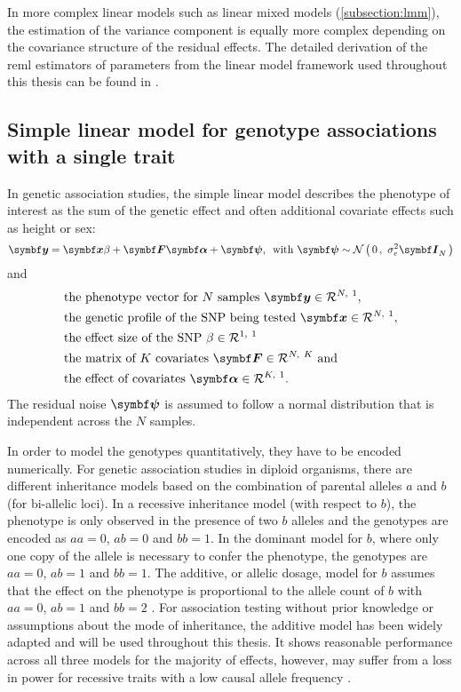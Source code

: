 In more complex linear models such as linear mixed models (\cref{subsection:lmm}), the estimation of the variance component is equally more complex depending on the covariance structure of the residual effects. The detailed derivation of the \gls{reml} estimators of parameters from the linear model framework used throughout this thesis can be found in \citep[Supplementary material]{Casale2015}. 

\subsection{Simple linear model for genotype associations with a single trait}
\label{subsection:lm-uv}
In genetic association studies, the simple linear model describes the phenotype of interest as the sum of the genetic effect and often additional covariate effects such as height or sex:
\begin{equation}
\mat{y} = \mat{x}\beta + \mat{F}\mat{\alpha} + \mat{\psi}, \,\text{ with }
\mat{\psi} \sim \normal 0 {\sigma_e^2\matsub{I}{N}}
\label{eq:lm-uv}
\end{equation}
%
and
%
\begin{align*} 
& \text{the phenotype vector for $N$ samples } \mat{y} \inR N 1,\\
& \text{the genetic profile of the SNP being tested }\mat{x} \inR N 1,\\
& \text{the effect size of the SNP } \beta \inR 1 1 \\
& \text{the matrix of $K$ covariates }\mat{F} \inR N K \text{ and}\\
& \text{the effect of covariates } \mat{\alpha} \inR K 1.
\end{align*} 
%
The residual noise \(\mat{\psi}\) is assumed to follow a normal distribution that is independent across the \(N\) samples.

In order to model the genotypes quantitatively, they have to be encoded numerically. For genetic association studies in diploid organisms, there are different inheritance models based on the combination of parental alleles \(a\) and \(b\) (for bi-allelic loci). In a recessive inheritance model (with respect to \(b\)), the phenotype is only observed in the presence of two \(b\) alleles and the genotypes are encoded as \(aa=0\), \(ab=0\) and \(bb=1\). In the dominant model for \(b\), where only one copy of the allele is necessary to confer the phenotype, the genotypes are \(aa=0\), \(ab=1\) and \(bb=1\). The additive, or allelic dosage, model for \(b\) assumes that the effect on the phenotype is proportional to the allele count of \(b\) with \(aa=0\), \(ab=1\) and \(bb=2\) \citep{Bush2012}. For association testing without prior knowledge or assumptions about the mode of inheritance, the additive model has been widely adapted and will be used throughout this thesis. It shows reasonable performance across all three models for the majority of effects, however, may suffer from a loss in power for recessive traits with a low causal allele frequency \citep{Lettre2007}. 

